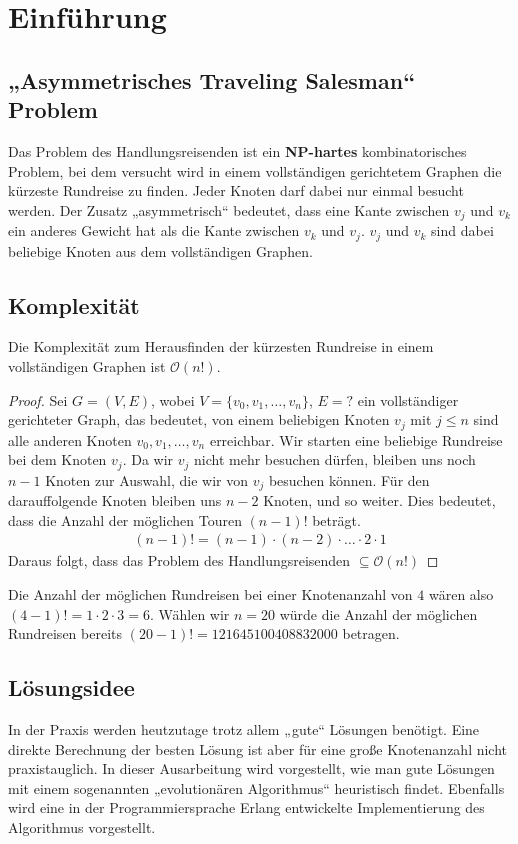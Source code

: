 \chapter{Einführung}
\section{„Asymmetrisches Traveling Salesman“ Problem}
Das Problem des Handlungsreisenden ist ein
\textbf{NP-hartes} kombinatorisches Problem, bei dem versucht wird in
einem vollständigen gerichtetem Graphen die kürzeste Rundreise zu finden. Jeder
Knoten darf dabei nur einmal besucht werden. Der Zusatz „asymmetrisch“
bedeutet, dass eine Kante zwischen $v_j$ und $v_k$ ein anderes Gewicht
hat als die Kante zwischen $v_k$ und $v_j$. $v_j$ und $v_k$ sind
dabei beliebige Knoten aus dem vollständigen Graphen.

\section{Komplexität}
\begin{theorem}
Die Komplexität zum Herausfinden der kürzesten Rundreise in einem
vollständigen Graphen ist $\mathcal{O}(n!)$. 
\end{theorem}

\begin{proof}
Sei $G=(V,E)$, wobei $V = \{ v_0, v_1, \dotsc, v_n\}$, $E= ?$ ein
vollständiger gerichteter Graph, das bedeutet, von einem
beliebigen Knoten $v_j$ mit $j \leq n$ sind alle anderen Knoten $v_0, v_1, \dotsc, v_n$
erreichbar. Wir starten eine beliebige Rundreise bei dem Knoten $v_j$.
Da wir $v_j$ nicht mehr besuchen dürfen, bleiben uns noch 
$n-1$ Knoten zur Auswahl, die wir von $v_j$ besuchen können. Für den
darauffolgende Knoten bleiben uns $n-2$ Knoten, und so weiter. Dies bedeutet, dass 
die Anzahl der möglichen Touren $(n-1)!$ beträgt.
\begin{align*}
  (n-1)! = (n-1) \cdot (n-2) \cdot \dotsc \cdot 2 \cdot 1
\end{align*}
Daraus folgt, dass das Problem des Handlungsreisenden $\subseteq \mathcal{O}(n!)$
\end{proof}
\begin{bem}
Die Anzahl der möglichen Rundreisen bei einer Knotenanzahl von $4$ wären also
$(4-1)! = 1 \cdot 2 \cdot 3 = 6$. Wählen wir $n = 20$ würde die
Anzahl der möglichen Rundreisen bereits $(20-1)! =
121645100408832000$ betragen.
\end{bem}

\section{Lösungsidee}
In der Praxis werden heutzutage trotz allem „gute“ Lösungen benötigt.
Eine direkte Berechnung der besten Lösung ist aber für eine große
Knotenanzahl nicht praxistauglich. In dieser Ausarbeitung wird
vorgestellt, wie man gute Lösungen mit einem sogenannten „evolutionären
Algorithmus“ heuristisch findet. Ebenfalls wird eine in der
Programmiersprache Erlang entwickelte Implementierung des Algorithmus 
vorgestellt.
